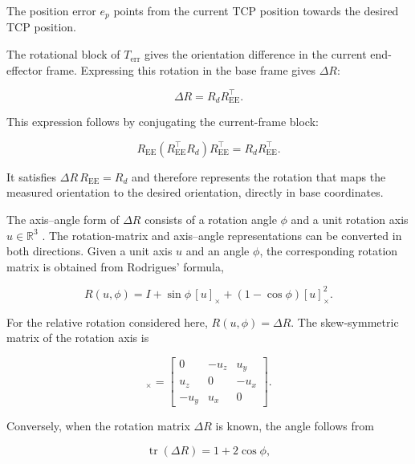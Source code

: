 The position error \mbox{\(e_p\)} points from the current TCP position towards
the desired TCP position.

The rotational block of \mbox{\(T_{\mathrm{err}}\)} gives the orientation
difference in the current end-effector frame. Expressing this rotation in the
base frame gives \mbox{\(\Delta R\)}:

\begin{equation}
\Delta R
=
R_dR_{\mathrm{EE}}^\top.
\label{eq:relative_rotation_error}
\end{equation}

This expression follows by conjugating the current-frame block:

\[
R_{\mathrm{EE}}(R_{\mathrm{EE}}^\top R_d)R_{\mathrm{EE}}^\top
=R_dR_{\mathrm{EE}}^\top.
\]

It satisfies \mbox{\(\Delta R\,R_{\mathrm{EE}}=R_d\)} and therefore
represents the rotation that maps the measured orientation to the desired
orientation, directly in base coordinates.

The axis--angle form of \mbox{\(\Delta R\)} consists of a rotation angle
\mbox{\(\phi\)} and a unit rotation axis \mbox{\(u\in\mathbb{R}^3\)}
\mbox{\cite{Siciliano2009,Murray1994}}. The rotation-matrix and axis--angle
representations can be converted in both directions. Given a unit axis
\mbox{\(u\)} and an angle \mbox{\(\phi\)}, the corresponding rotation matrix is
obtained from Rodrigues' formula,

\begin{equation}
R(u,\phi)
=
I
+\sin\phi\,[u]_\times
+(1-\cos\phi)[u]_\times^2.
\label{eq:rodrigues_formula}
\end{equation}

For the relative rotation considered here, \mbox{\(R(u,\phi)=\Delta R\)}. The
skew-symmetric matrix of the rotation axis is

\begin{equation}
[u]_\times
=
\begin{bmatrix}
0 & -u_z & u_y\\
u_z & 0 & -u_x\\
-u_y & u_x & 0
\end{bmatrix}.
\label{eq:skew_symmetric_axis_matrix}
\end{equation}

Conversely, when the rotation matrix \mbox{\(\Delta R\)} is known, the angle
follows from

\begin{equation}
\operatorname{tr}(\Delta R)
=
1+2\cos\phi,
\label{eq:trace_angle_relation}
\end{equation}

